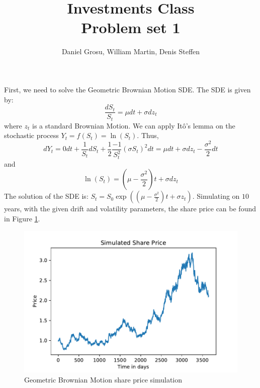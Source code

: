 \documentclass[10pt]{article}
\newenvironment{exercise}[2][Exercise]{\begin{trivlist}
  \item[\hskip \labelsep {\bfseries #1}\hskip \labelsep {\bfseries #2.}]}{\end{trivlist}}
\begin{document}
	
  \renewcommand{\qedsymbol}{\smiley}
	\title{Investments Class \\ Problem set 1}
	\author{Daniel Grosu, William Martin, Denis Steffen}
	
	\maketitle

  \begin{exercise}{1}
    First, we need to solve the Geometric Brownian Motion SDE. 
    The SDE is given by: 
    $$ \frac{dS_t}{S_t} = \mu dt + \sigma dz_t$$ where $z_t$ is a standard Brownian Motion. 
    We can apply Itô's lemma on the stochastic process $Y_t = f(S_t) = \ln(S_t)$.
    Thus, $$ dY_t = 0 dt +  \frac{1}{S_t}dS_t + \frac{1}{2}\frac{-1}{S_t^2}(\sigma S_t)^2 dt = \mu dt + \sigma dz_t - \frac{\sigma^2}{2}dt$$
    and $$ \ln(S_t) = (\mu-\frac{\sigma^2}{2})t + \sigma dz_t$$
    The solution of the SDE is: $ S_t = S_0 \exp((\mu-\frac{\sigma^2}{2})t+ \sigma z_t)$.
    Simulating on $10$ years, with the given drift and volatility parameters, the share price can be found in Figure \ref{GMB}. 
    \begin{figure}[h]
      \centering
      \includegraphics[scale = 0.71]{Figures/simulated.pdf}
      \caption{Geometric Brownian Motion share price simulation}
      \label{GMB}
    \end{figure}
  \end{exercise}




\end{document}

